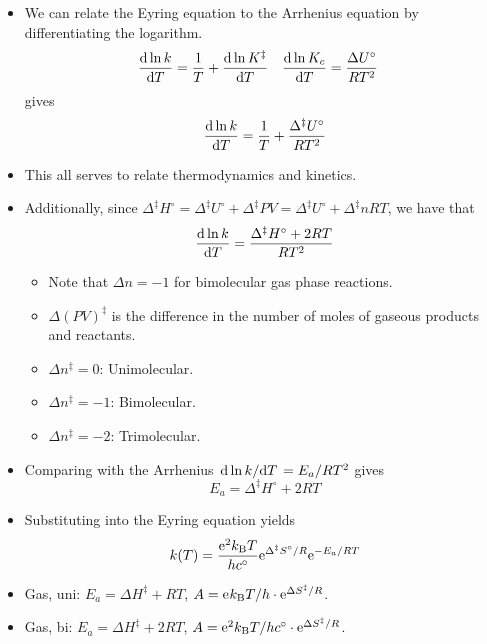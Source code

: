 \documentclass[../notes.tex]{subfiles}
\begin{document}
\begin{itemize}
\begin{itemize}
        \item We can relate the Eyring equation to the Arrhenius equation by differentiating the logarithm.
        \begin{align*}
            \dv{\ln k}{T} &= \frac{1}{T}+\dv{\ln K^\ddagger}{T}&
            \dv{\ln K_c}{T} &= \frac{\Delta U^\circ}{RT^2}
        \end{align*}
        gives
        \begin{equation*}
            \dv{\ln k}{T} = \frac{1}{T}+\frac{\Delta^\ddagger U^\circ}{RT^2}
        \end{equation*}
        \item This all serves to relate thermodynamics and kinetics.
        \item Additionally, since $\Delta^\ddagger H^\circ=\Delta^\ddagger U^\circ+\Delta^\ddagger PV=\Delta^\ddagger U^\circ+\Delta^\ddagger nRT$, we have that
        \begin{equation*}
            \dv{\ln k}{T} = \frac{\Delta^\ddagger H^\circ+2RT}{RT^2}
        \end{equation*}
        \begin{itemize}
            \item Note that $\Delta n=-1$ for bimolecular gas phase reactions.
            \item $\Delta(PV)^\ddagger$ is the difference in the number of moles of gaseous products and reactants.
            \item $\Delta n^\ddagger=0$: Unimolecular.
            \item $\Delta n^\ddagger=-1$: Bimolecular.
            \item $\Delta n^\ddagger=-2$: Trimolecular.
        \end{itemize}
        \item Comparing with the Arrhenius $\dv*{\ln k}{T}=E_a/RT^2$ gives
        \begin{equation*}
            E_a = \Delta^\ddagger H^\circ+2RT
        \end{equation*}
        \item Substituting into the Eyring equation yields
        \begin{equation*}
            k(T) = \frac{\e[2]\kB T}{hc^\circ}\e[\Delta^\ddagger S^\circ/R]\e[-E_a/RT]
        \end{equation*}
        \item Gas, uni: $E_a=\Delta H^\ddagger+RT$, $A=\e\kB T/h\cdot\e[\Delta S^\ddagger/R]$.
        \item Gas, bi: $E_a=\Delta H^\ddagger+2RT$, $A=\e[2]\kB T/hc^\circ\cdot\e[\Delta S^\ddagger/R]$.

\end{itemize}
\end{itemize}
\end{document}
